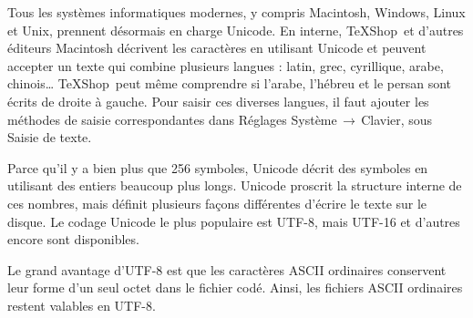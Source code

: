 \documentclass[11pt,french]{article}
\newcommand{\TS}{\textsf{\TeX Shop}}
\newcommand{\cmd}[1]{\textsf{#1}}
\newcommand{\To}{\,\(\to\)\,}
\begin{document}
Tous les systèmes informatiques modernes, y compris Macintosh, Windows, Linux et Unix, prennent désormais en charge Unicode. En interne, \TS\ et d'autres éditeurs Macintosh décrivent les caractères en utilisant Unicode et peuvent accepter un texte qui combine plusieurs langues : latin, grec, cyrillique, arabe, chinois… \TS\ peut même comprendre si l'arabe, l'hébreu et le persan sont écrits de droite à gauche. Pour saisir ces diverses langues, il faut ajouter les méthodes de saisie correspondantes dans \cmd{Réglages Système}\To\cmd{Clavier}, sous \cmd{Saisie de texte}.

Parce qu'il y a bien plus que 256 symboles, Unicode décrit des symboles en utilisant des entiers beaucoup plus longs. Unicode proscrit la structure interne de ces nombres, mais définit plusieurs façons différentes d'écrire le texte sur le disque. Le codage Unicode le plus populaire est UTF-8, mais UTF-16 et d'autres encore sont disponibles.

Le grand avantage d'UTF-8 est que les caractères ASCII ordinaires conservent leur forme d'un seul octet dans le fichier codé. Ainsi, les fichiers ASCII ordinaires restent valables en UTF-8.
\end{document}
